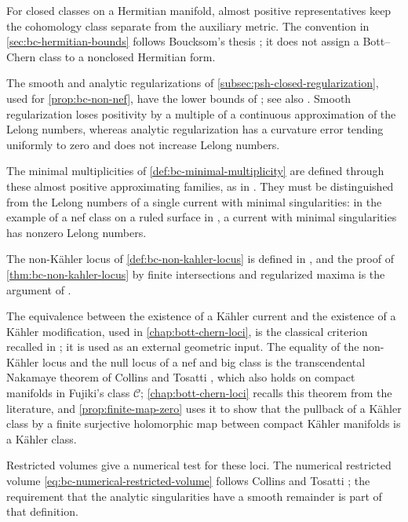 For closed classes on a Hermitian manifold, almost positive representatives keep the cohomology class separate from the auxiliary metric. The convention in \cref{sec:bc-hermitian-bounds} follows Boucksom's thesis \cite[Section 2.1.2]{BouThesis02}; it does not assign a Bott--Chern class to a nonclosed Hermitian form.

The smooth and analytic regularizations of \cref{subsec:psh-closed-regularization}, used for \cref{prop:bc-non-nef}, have the lower bounds of \cite[Theorem 2.1]{Bou04Zariski}; see also \cite[Theorems 1.2.9--1.2.10]{BouThesis02}. Smooth regularization loses positivity by a multiple of a continuous approximation of the Lelong numbers, whereas analytic regularization has a curvature error tending uniformly to zero and does not increase Lelong numbers.

The minimal multiplicities of \cref{def:bc-minimal-multiplicity} are defined through these almost positive approximating families, as in \cite[Definition 2.1.5]{BouThesis02}. They must be distinguished from the Lelong numbers of a single current with minimal singularities: in the example of a nef class on a ruled surface in \cite[Section 1.2.3]{BouThesis02}, a current with minimal singularities has nonzero Lelong numbers.

The non-K\"ahler locus of \cref{def:bc-non-kahler-locus} is defined in \cite[Definition 2.1.19]{BouThesis02}, and the proof of \cref{thm:bc-non-kahler-locus} by finite intersections and regularized maxima is the argument of \cite[Theorem 2.1.20]{BouThesis02}.

The equivalence between the existence of a K\"ahler current and the existence of a K\"ahler modification, used in \cref{chap:bott-chern-loci}, is the classical criterion recalled in \cite[Theorem 1.2.11]{BouThesis02}; it is used as an external geometric input. The equality of the non-K\"ahler locus and the null locus of a nef and big class is the transcendental Nakamaye theorem of Collins and Tosatti \cite[Theorem~1.1, p.~1168]{CT15Loci}, which also holds on compact manifolds in Fujiki's class $\mathcal C$; \cref{chap:bott-chern-loci} recalls this theorem from the literature, and \cref{prop:finite-map-zero} uses it to show that the pullback of a K\"ahler class by a finite surjective holomorphic map between compact K\"ahler manifolds is a K\"ahler class.

Restricted volumes give a numerical test for these loci. The numerical restricted volume \eqref{eq:bc-numerical-restricted-volume} follows Collins and Tosatti \cite[Section 2]{CT22Restricted}; the requirement that the analytic singularities have a smooth remainder is part of that definition.


